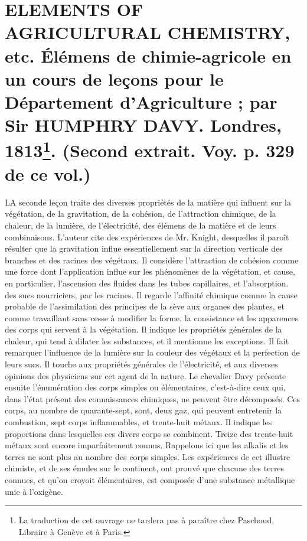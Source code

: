 \setcounter{page}{371}
\section{ELEMENTS OF AGRICULTURAL CHEMISTRY, etc. Élémens de chimie-agricole en un cours de leçons pour le Département d'Agriculture ; par Sir HUMPHRY DAVY. Londres, 1813\footnote{La traduction de cet ouvrage ne tardera pas à paraître chez Paschoud, Libraire à Genève et à Paris.}. \large{(Second extrait. Voy. p. 329 de ce vol.)}}
LA seconde leçon traite des diverses propriétés de la matière qui influent sur la végétation, de la gravitation, de la cohésion, de l'attraction chimique, de la chaleur, de la lumière, de l'électricité, des élémens de la matière et de leurs combinaisons. L'auteur cite des expériences de Mr. Knight, desquelles il paroît résulter que la gravitation influe essentiellement sur la direction verticale des branches et des racines des végétaux. Il considère l'attraction de cohésion comme une force dont l'application influe sur les phénomènes de la végétation, et cause, en particulier, l'ascension des fluides dans les tubes capillaires, et l'absorption.\setcounter{page}{372} des sucs nourriciers, par les racines. Il regarde l'affinité chimique comme la cause probable de l'assimilation des principes de la sève aux organes des plantes, et comme travaillant sans cesse à modifier la forme, la consistance et les apparences des corps qui servent à la végétation. Il indique les propriétés générales de la chaleur, qui tend à dilater les substances, et il mentionne les exceptions. Il fait remarquer l'influence de la lumière sur la couleur des végétaux et la perfection de leurs sucs. Il touche aux propriétés générales de l'électricité, et aux diverses opinions des physiciens sur cet agent de la nature.
Le chevalier Davy présente ensuite l'énumération des corps simples ou élémentaires, c'est-à-dire ceux qui, dans l'état présent des connaissances chimiques, ne peuvent être décomposés. Ces corps, au nombre de quarante-sept, sont, deux gaz, qui peuvent entretenir la combustion, sept corps inflammables, et trente-huit métaux. Il indique les proportions dans lesquelles ces divers corps se combinent. Treize des trente-huit métaux sont encore imparfaitement connus. Rappelons ici que les alkalis et les terres ne sont plus au nombre des corps simples. Les expériences de cet illustre chimiste, et de ses émules sur le continent, ont prouvé\setcounter{page}{373} que chacune des terres connues, et qu'on croyoit élémentaires, est composée d'une substance métallique unie à l'oxigène.
